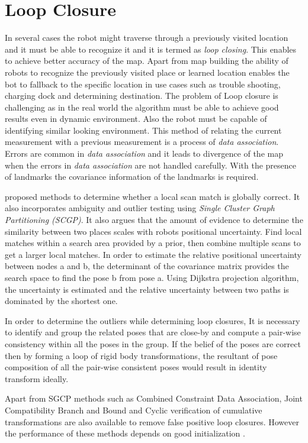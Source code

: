 \section{Loop Closure}
In several cases the robot might traverse through a previously visited location and it must be able to recognize it and it is termed as \textit{loop closing}. This enables to achieve better accuracy of the map. Apart from map building the ability of robots to recognize the previously visited place or learned location enables the bot to fallback to the specific location in use cases such as trouble shooting, charging dock and determining destination. The problem of Loop closure is challenging as in the real world the algorithm must be able to achieve good results even in dynamic environment. Also the robot must be capable of identifying similar looking environment. This method of relating the current measurement with a previous measurement is a process of \textit{data association}. Errors are common in \textit{data association} and it leads to divergence of the map when the errors in \textit{data association} are not handled carefully. With the presence of landmarks the covariance information of the landmarks is required.
\par
\cite{E.Olson/LocalSM} proposed methods to determine whether a local scan match is globally correct. It also incorporates ambiguity and outlier testing using \textit{Single Cluster Graph Partitioning (SCGP)}. It also argues that the amount of evidence to determine the similarity between two places scales with robots positional uncertainty. Find local matches within a search area provided by a prior, then combine multiple scans to get a larger local matches. In order to estimate the relative positional uncertainty between nodes a and b, the determinant of the covariance matrix provides the search space to find the pose b from pose a. Using Dijkstra projection algorithm, the uncertainty is estimated and the relative uncertainty between two paths is dominated by the shortest one. 
\par
In order to  determine the outliers while determining loop closures, It is necessary to identify and group the related poses that are close-by and compute a pair-wise consistency within all the poses in the group. If the belief of the poses are correct then by forming a loop of rigid body transformations, the resultant of pose composition of all the pair-wise consistent poses would result in identity transform ideally. 
\par
Apart from SGCP methods such as Combined Constraint Data Association, Joint Compatibility Branch and Bound and Cyclic verification of cumulative transformations are also available to remove false positive loop closures. However the performance of these methods depends on good initialization \cite{P.Agarwal}.
